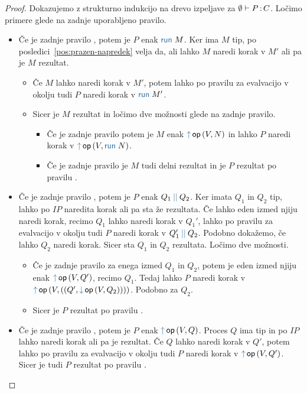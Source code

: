 \begin{proof}
	Dokazujemo z strukturno indukcijo na drevo izpeljave za $\emptyset \vdash P \mathinner{:} C$.
	Ločimo primere glede na zadnje uporabljeno pravilo.
	
	\begin{itemize}
		\item Če je zadnje pravilo , potem je $P$ enak $\tmrun{M}$.
		Ker ima $M$ tip, po posledici~\ref{pos:prazen-napredek} velja da, ali lahko $M$ naredi korak v $M'$ ali pa je $M$ rezultat.
		\begin{itemize}
			\item Če $M$ lahko naredi korak v $M'$, potem lahko po pravilu za evalvacijo v okolju tudi $P$ naredi korak v $\tmrun{M'}$.
			\item Sicer je $M$ rezultat in ločimo dve možnosti glede na zadnje pravilo.
			\begin{itemize}
				\item Če je zadnje pravilo  potem je $M$ enak $\tmopout{op}{V}{N}$ in lahko $P$ naredi korak v $\tmopout{op}{V}{\tmrun{N}}$.
				\item Če je zadnje pravilo  je $M$ tudi delni rezultat in je $P$ rezultat po pravilu .
			\end{itemize}
		\end{itemize}
		
		\item Če je zadnje pravilo , potem je $P$ enak $\tmpar{Q_1}{Q_2}$. Ker imata $Q_1$ in $Q_2$ tip, lahko po $IP$ naredita korak ali pa sta že rezultata.
		Če lahko eden izmed njiju naredi korak, recimo $Q_1$ lahko naredi korak v $Q_1'$, lahko po pravilu za evalvacijo v okolju tudi $P$ naredi korak v $\tmpar{Q_1'}{Q_2}$. Podobno dokažemo, če lahko $Q_2$ naredi korak.
		Sicer sta $Q_1$ in $Q_2$ rezultata. Ločimo dve možnosti.
		\begin{itemize}
			\item Če je zadnje pravilo  za enega izmed $Q_1$ in $Q_2$, potem je eden izmed njiju enak $\tmopout{op}{V}{Q'}$, recimo $Q_1$. Tedaj lahko $P$ naredi korak v $\tmopout{op}{V}{(\tmpair{Q'}{\tmopin{op}{V}{Q_2}})}$. Podobno za $Q_2$.
			\item Sicer je $P$ rezultat po pravilu .
		\end{itemize}
		
		\item Če je zadnje pravilo , potem je $P$ enak $\tmopout{op}{V}{Q}$. Proces $Q$ ima tip in po $IP$ lahko naredi korak ali pa je rezultat.
		Če $Q$ lahko naredi korak v $Q'$, potem lahko po pravilu za evalvacijo v okolju tudi $P$ naredi korak v $\tmopout{op}{V}{Q'}$.
		Sicer je tudi $P$ rezultat po pravilu .
		

\end{itemize}
\end{proof}
